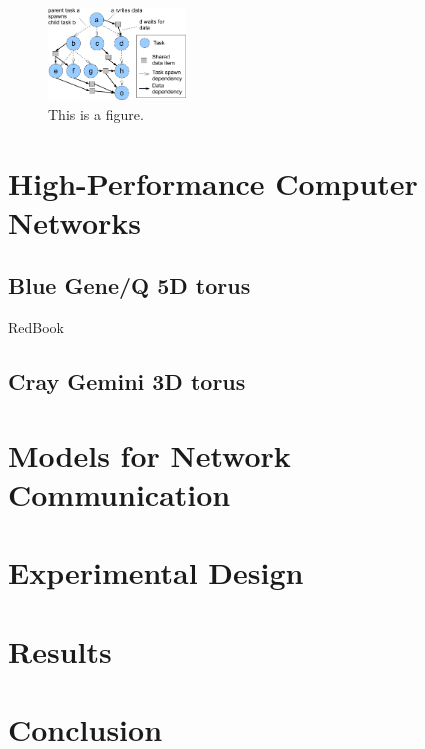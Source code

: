 \documentclass[conference,10pt]{IEEEtran}
\begin{document}
\label{sect:ddt-model}
\begin{figure}
  \center
  \includegraphics[width=0.325\textwidth]{fig/task-data}
  \caption{This is a figure.
    \label{fig:task-data}}
\end{figure}

\section{High-Performance Computer Networks}

\subsection{Blue Gene/Q 5D torus}
RedBook~\cite{BGQ_RedBook_2013}

\subsection{Cray Gemini 3D torus}

\section{Models for Network Communication}

\section{Experimental Design}

\section{Results}

\section{Conclusion}




\end{document}

